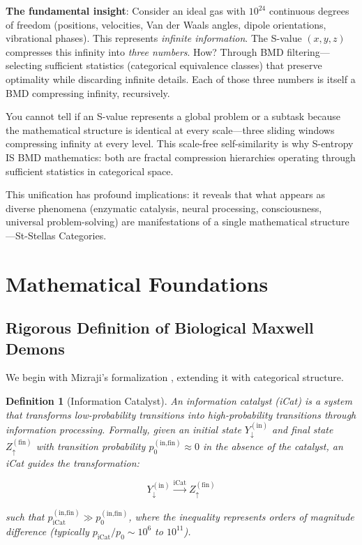 \documentclass[12pt,a4paper]{article}
\newtheorem{definition}[theorem]{Definition}
\begin{document}
\textbf{The fundamental insight}: Consider an ideal gas with $10^{24}$ continuous degrees of freedom (positions, velocities, Van der Waals angles, dipole orientations, vibrational phases). This represents \textit{infinite information}. The S-value $(x, y, z)$ compresses this infinity into \textit{three numbers}. How? Through BMD filtering—selecting sufficient statistics (categorical equivalence classes) that preserve optimality while discarding infinite details. Each of those three numbers is itself a BMD compressing infinity, recursively.

You cannot tell if an S-value represents a global problem or a subtask because the mathematical structure is identical at every scale—three sliding windows compressing infinity at every level. This scale-free self-similarity is why S-entropy IS BMD mathematics: both are fractal compression hierarchies operating through sufficient statistics in categorical space.

This unification has profound implications: it reveals that what appears as diverse phenomena (enzymatic catalysis, neural processing, consciousness, universal problem-solving) are manifestations of a single mathematical structure—St-Stellas Categories.

\section{Mathematical Foundations}

\subsection{Rigorous Definition of Biological Maxwell Demons}

We begin with Mizraji's formalization \cite{mizraji2021biological}, extending it with categorical structure.

\begin{definition}[Information Catalyst]
\label{def:icat}
An information catalyst (iCat) is a system that transforms low-probability transitions into high-probability transitions through information processing. Formally, given an initial state $Y_{\downarrow}^{(\text{in})}$ and final state $Z_{\uparrow}^{(\text{fin})}$ with transition probability $p_0^{(\text{in,fin})} \approx 0$ in the absence of the catalyst, an iCat guides the transformation:

\begin{equation}
Y_{\downarrow}^{(\text{in})} \xrightarrow{\text{iCat}} Z_{\uparrow}^{(\text{fin})}
\end{equation}

such that $p_{\text{iCat}}^{(\text{in,fin})} \gg p_0^{(\text{in,fin})}$, where the inequality represents orders of magnitude difference (typically $p_{\text{iCat}}/p_0 \sim 10^6$ to $10^{11}$).
\end{definition}
\end{document}
